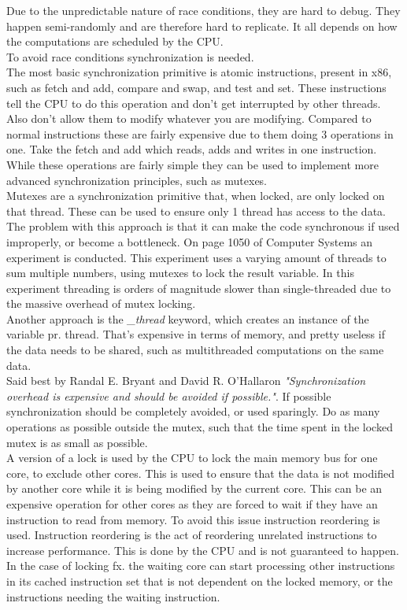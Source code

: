 \documentclass[11pt]{report}
\begin{document}
Due to the unpredictable nature of race conditions, they are hard to debug. They happen semi-randomly and are therefore hard to replicate. It all depends on how the computations are scheduled by the CPU.\\[1ex]

To avoid race conditions synchronization is needed.\\
The most basic synchronization primitive is atomic instructions, present in x86, such as fetch and add, compare and swap, and test and set. These instructions tell the CPU to do this operation and don't get interrupted by other threads. Also don't allow them to modify whatever you are modifying. Compared to normal instructions these are fairly expensive due to them doing 3 operations in one. Take the fetch and add which reads, adds and writes in one instruction. While these operations are fairly simple they can be used to implement more advanced synchronization principles, such as mutexes.\\[1ex]

Mutexes are a synchronization primitive that, when locked, are only locked on that thread. These can be used to ensure only 1 thread has access to the data. The problem with this approach is that it can make the code synchronous if used improperly, or become a bottleneck. On page 1050 of Computer Systems\cite{computer-systems} an experiment is conducted. This experiment uses a varying amount of threads to sum multiple numbers, using mutexes to lock the result variable. In this experiment threading is orders of magnitude slower than single-threaded due to the massive overhead of mutex locking.\\[1ex]

Another approach is the \textit{\_thread} keyword, which creates an instance of the variable pr. thread. That's expensive in terms of memory, and pretty useless if the data needs to be shared, such as multithreaded computations on the same data.\\[1ex]

Said best by Randal E. Bryant and David R. O'Hallaron \textit{"Synchronization overhead is expensive and should be avoided if possible."}\cite{computer-systems}. If possible synchronization should be completely avoided, or used sparingly. Do as many operations as possible outside the mutex, such that the time spent in the locked mutex is as small as possible.\\[1ex]

A version of a lock is used by the CPU to lock the main memory bus for one core, to exclude other cores. This is used to ensure that the data is not modified by another core while it is being modified by the current core. This can be an expensive operation for other cores as they are forced to wait if they have an instruction to read from memory. To avoid this issue instruction reordering is used. Instruction reordering is the act of reordering unrelated instructions to increase performance. This is done by the CPU and is not guaranteed to happen. In the case of locking fx. the waiting core can start processing other instructions in its cached instruction set that is not dependent on the locked memory, or the instructions needing the waiting instruction.\\[1ex]
\end{document}
